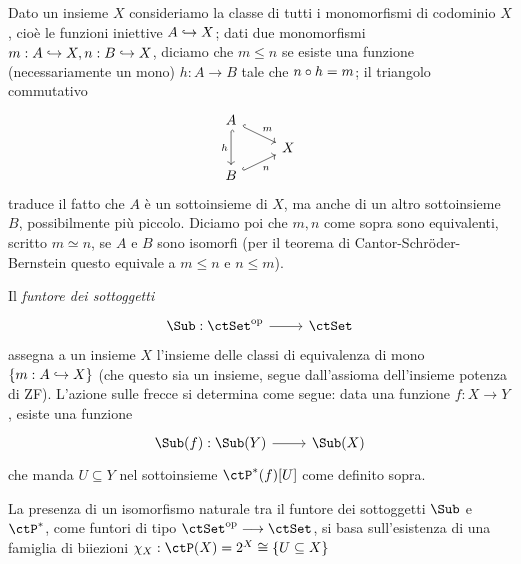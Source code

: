 \begin{definition}\label{def_fun_sub_onset}
	Dato un insieme \(X\) consideriamo la classe di tutti i monomorfismi di codominio \(X\), cioè le funzioni iniettive \(A\hookrightarrow X\); dati due monomorfismi \(m : A\hookrightarrow X, n : B\hookrightarrow X\), diciamo che \(m\le n\) se esiste una funzione (necessariamente un mono) \(h : A\to B\) tale che \(n\circ h = m\); il triangolo commutativo
	\[\begin{tikzcd}[row sep=2mm]
			A \\
			& X \\
			B
			\arrow["m", hook, from=1-1, to=2-2]
			\arrow["h"', hook, from=1-1, to=3-1]
			\arrow["n"', hook, from=3-1, to=2-2]
		\end{tikzcd}\]
	traduce il fatto che \(A\) è un sottoinsieme di \(X\), ma anche di un altro sottoinsieme \(B\), possibilmente più piccolo. Diciamo poi che \(m,n\) come sopra sono equivalenti, scritto \(m\simeq n\), se \(A\) e \(B\) sono isomorfi (per il teorema di Cantor-Schröder-Bernstein questo equivale a \(m\le n\) e \(n\le m\)).

	Il \emph{funtore dei sottoggetti}
	\[\dmFun{\Sub}{\ctSet^\op}{\ctSet}\]
	assegna a un insieme \(X\) l'insieme delle classi di equivalenza di mono \(\{m : A\hookrightarrow X\}\) (che questo sia un insieme, segue dall'assioma dell'insieme potenza di ZF). L'azione sulle frecce si determina come segue: data una funzione \(f : X\to Y\), esiste una funzione
	\[\dmFun{\Sub(f)}{\Sub(Y)}{\Sub(X)}\]
	che manda \(U\subseteq Y\) nel sottoinsieme \(\ctP^*(f)[U]\) come definito sopra.

	La presenza di un isomorfismo naturale tra il funtore dei sottoggetti \(\Sub\) e \(\ctP^*\), come funtori di tipo \(\ctSet^\op\fun\ctSet\), si basa sull'esistenza di una famiglia di biiezioni \(\chi_X : \ctP(X) = \pow X \cong \{U\subseteq X\}\)
\end{definition}
